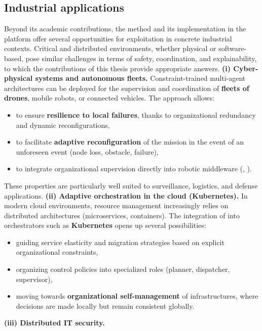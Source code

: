 \subsection*{Industrial applications}
Beyond its academic contributions, the  method and its implementation in the  platform offer several opportunities for exploitation in concrete industrial contexts.
Critical and distributed environments, whether physical or software-based, pose similar challenges in terms of safety, coordination, and explainability, to which the contributions of this thesis provide appropriate answers.
\medskip
\noindent
\textbf{(i) Cyber-physical systems and autonomous fleets.}
Constraint-trained multi-agent architectures can be deployed for the supervision and coordination of \textbf{fleets of drones}, mobile robots, or connected vehicles.
The  approach allows:
\begin{itemize}
  \item to ensure \textbf{resilience to local failures}, thanks to organizational redundancy and dynamic reconfigurations,
  \item to facilitate \textbf{adaptive reconfiguration} of the mission in the event of an unforeseen event (node loss, obstacle, failure),

  \item to integrate organizational supervision directly into robotic middleware (, ).
\end{itemize}
These properties are particularly well suited to surveillance, logistics, and defense applications.
\medskip
\noindent
\textbf{(ii) Adaptive orchestration in the cloud (Kubernetes).}
In modern cloud environments, resource management increasingly relies on distributed architectures (microservices, containers).
The integration of  into orchestrators such as \textbf{Kubernetes} opens up several possibilities:
\begin{itemize}

  \item guiding service elasticity and migration strategies based on explicit organizational constraints,
  \item organizing control policies into specialized roles (planner, dispatcher, supervisor),
  \item moving towards \textbf{organizational self-management} of infrastructures, where decisions are made locally but remain consistent globally.
\end{itemize}
\medskip
\noindent
\textbf{(iii) Distributed IT security.}
